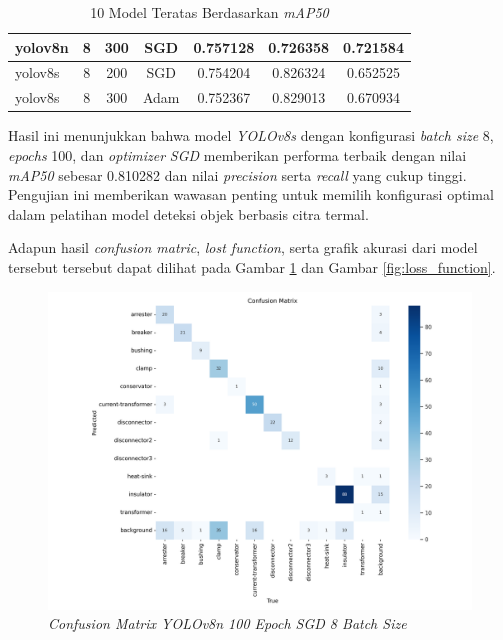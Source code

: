 \begin{table}[h!]
\begin{tabular}{|l|c|c|c|c|c|c|}
    yolov8n       & 8                   & 300             & SGD                         & 0.757128                & 0.726358                      & 0.721584                   \\ \hline
    yolov8s       & 8                   & 200             & SGD                         & 0.754204                & 0.826324                      & 0.652525                   \\ \hline
    yolov8s       & 8                   & 300             & Adam                        & 0.752367                & 0.829013                      & 0.670934                   \\ \hline
    \end{tabular}
    \caption{10 Model Teratas Berdasarkan \textit{mAP50}}
    \label{tab:model_teratas_map50}
\end{table}

Hasil ini menunjukkan bahwa model \emph{YOLOv8s} dengan konfigurasi \emph{batch size} 8, \emph{epochs} 100, dan \emph{optimizer} \emph{SGD} memberikan performa terbaik dengan nilai \emph{mAP50} sebesar 0.810282 dan nilai \emph{precision} serta \emph{recall} yang cukup tinggi. Pengujian ini memberikan wawasan penting untuk memilih konfigurasi optimal dalam pelatihan model deteksi objek berbasis citra termal.

Adapun hasil \emph{confusion matric}, \emph{lost function}, serta grafik akurasi dari model tersebut tersebut dapat dilihat pada Gambar \ref{fig:confusion_matrix} dan Gambar \ref{fig:loss_function}.
\begin{figure}[H] 
    \centering
    \includegraphics[scale=0.15]{gambar/cf_res.png}
    \caption{\emph{Confusion Matrix YOLOv8n 100 Epoch SGD 8 Batch Size}}
    \label{fig:confusion_matrix}
\end{figure}

